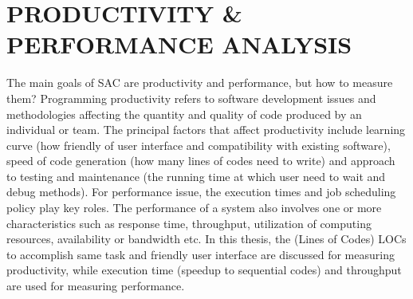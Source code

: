 %
%
%


\chapter{\uppercase {Productivity \& Performance Analysis}}
The main goals of SAC are productivity and performance, but how to measure them? Programming productivity \cite{ProgramProductWiki} refers to software development issues and methodologies affecting the quantity and quality of code produced by an individual or team. The principal factors that affect productivity include learning curve (how friendly of user interface and compatibility with existing software), speed of code generation (how many lines of codes need to write) and approach to testing and maintenance (the running time at which user need to wait and debug methods). For performance issue, the execution times and job scheduling policy play key roles. The performance of a system also involves one or more characteristics such as response time, throughput, utilization of computing resources, availability or bandwidth etc. In this thesis, the (Lines of Codes) LOCs to accomplish same task and friendly user interface are discussed for measuring productivity, while execution time (speedup to sequential codes) and throughput are used for measuring performance.  

